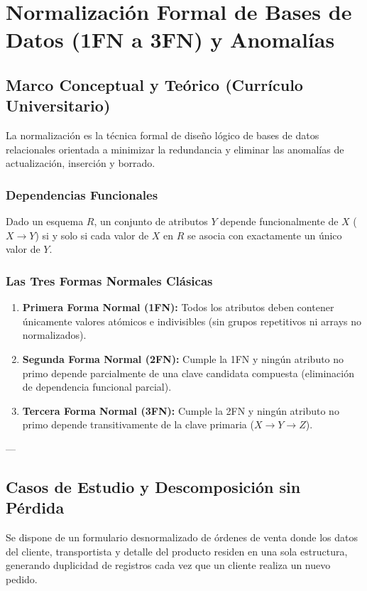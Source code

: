 \chapter{Normalizaci\'on Formal de Bases de Datos (1FN a 3FN) y Anomal\'ias}
\label{cap:normalizacion_1fn_3fn}

\section{Marco Conceptual y Te\'orico (Curr\'iculo Universitario)}

La normalizaci\'on es la t\'ecnica formal de dise\~no l\'ogico de bases de datos relacionales orientada a minimizar la redundancia y eliminar las anomal\'ias de actualizaci\'on, inserci\'on y borrado.

\subsection{Dependencias Funcionales}
Dado un esquema $R$, un conjunto de atributos $Y$ depende funcionalmente de $X$ ($X \rightarrow Y$) si y solo si cada valor de $X$ en $R$ se asocia con exactamente un \'unico valor de $Y$.

\subsection{Las Tres Formas Normales Cl\'asicas}
\begin{enumerate}
    \item \textbf{Primera Forma Normal (1FN):} Todos los atributos deben contener \'unicamente valores at\'omicos e indivisibles (sin grupos repetitivos ni arrays no normalizados).
    \item \textbf{Segunda Forma Normal (2FN):} Cumple la 1FN y ning\'un atributo no primo depende parcialmente de una clave candidata compuesta (eliminaci\'on de dependencia funcional parcial).
    \item \textbf{Tercera Forma Normal (3FN):} Cumple la 2FN y ning\'un atributo no primo depende transitivamente de la clave primaria ($X \rightarrow Y \rightarrow Z$).
\end{enumerate}

---

\section{Casos de Estudio y Descomposici\'on sin P\'erdida}

\begin{businessproblem}
Se dispone de un formulario desnormalizado de \'ordenes de venta donde los datos del cliente, transportista y detalle del producto residen en una sola estructura, generando duplicidad de registros cada vez que un cliente realiza un nuevo pedido.
\end{businessproblem}

